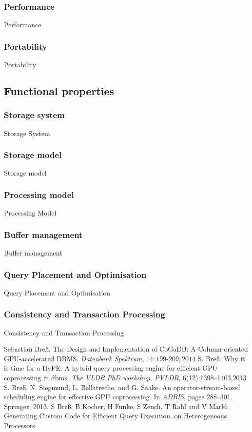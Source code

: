 \documentclass[a4paper, 11pt]{article}
\begin{document}
\subsubsection*{Performance}
Performance

\subsubsection*{Portability}
Portability

\subsection*{Functional properties}
\subsubsection*{Storage system}
Storage System

\subsubsection*{Storage model}
Storage model

\subsubsection*{Processing model}
Processing Model

\subsubsection*{Buffer management}
Buffer management

\subsubsection*{Query Placement and Optimisation}
Query Placement and Optimisation

\subsubsection*{Consistency and Transaction Processing}
Consistency and Transaction Processing


\begin{thebibliography}{9}
Sebastian Bre{ß}. The Design and Implementation of CoGaDB: A Column-oriented GPU-accelerated DBMS. \emph{Datenbank Spektrum}, $14:199\text{-}209,2014$ 
  S. Breß. Why it is time for a HyPE: A hybrid query processing engine for efficient
GPU coprocessing in dbms. \emph{The VLDB PhD workshop, PVLDB}, 6(12):1398–1403,2013
 S. Breß, N. Siegmund, L. Bellatreche, and G. Saake. An operator-stream-based
scheduling engine for effective GPU coprocessing. In \emph{ADBIS}, pages 288–301. Springer, 2013.
 S Breß, B Kocher, H Funke, S Zeuch, T Rabl and V Markl. Generating Custom Code for Efficient Query Execution.
on Heterogeneous Processors
\end{thebibliography}
\end{document}
